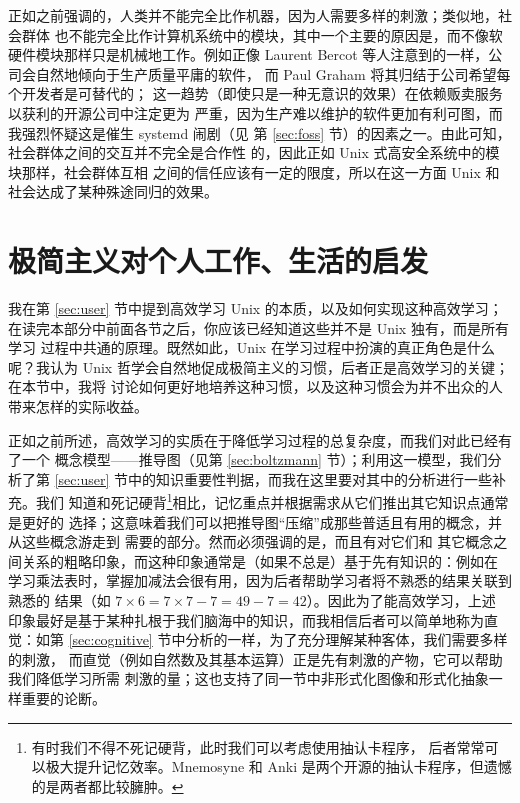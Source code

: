 正如之前强调的，人类并不能完全比作机器，因为人需要多样的刺激；类似地，社会群体
也不能完全比作计算机系统中的模块，其中一个主要的原因是，而不像软硬件模块那样只是机械地工作。例如正像 Laurent Bercot
等人注意到的一样，公司会自然地倾向于生产质量平庸的软件，
而 Paul Graham 将其归结于公司希望每个开发者是可替代的；
这一趋势（即使只是一种无意识的效果）在依赖贩卖服务以获利的开源公司中注定更为
严重，因为生产难以维护的软件更加有利可图，而我强烈怀疑这是催生 systemd 闹剧（见
第 \ref{sec:foss} 节）的因素之一。由此可知，社会群体之间的交互并不完全是合作性
的，因此正如 Unix 式高安全系统中的模块那样，社会群体互相
之间的信任应该有一定的限度，所以在这一方面 Unix 和社会达成了某种殊途同归的效果。

\section{极简主义对个人工作、生活的启发}\label{sec:worklife}

我在第 \ref{sec:user} 节中提到高效学习 Unix 的本质，以及如何实现这种高效学习；
在读完本部分中前面各节之后，你应该已经知道这些并不是 Unix 独有，而是所有学习
过程中共通的原理。既然如此，Unix 在学习过程中扮演的真正角色是什么呢？我认为
Unix 哲学会自然地促成极简主义的习惯，后者正是高效学习的关键；在本节中，我将
讨论如何更好地培养这种习惯，以及这种习惯会为并不出众的人带来怎样的实际收益。

正如之前所述，高效学习的实质在于降低学习过程的总复杂度，而我们对此已经有了一个
概念模型——推导图（见第 \ref{sec:boltzmann} 节）；利用这一模型，我们分析了第
\ref{sec:user} 节中的知识重要性判据，而我在这里要对其中的分析进行一些补充。我们
知道和死记硬背\footnote{有时我们不得不死记硬背，此时我们可以考虑使用抽认卡程序，
后者常常可以极大提升记忆效率。Mnemosyne 和 Anki 是两个开源的抽认卡程序，但遗憾
的是两者都比较臃肿。}相比，记忆重点并根据需求从它们推出其它知识点通常是更好的
选择；这意味着我们可以把推导图“压缩”成那些普适且有用的概念，并从这些概念游走到
需要的部分。然而必须强调的是，而且有对它们和
其它概念之间关系的粗略印象，而这种印象通常是（如果不总是）基于先有知识的：例如在
学习乘法表时，掌握加减法会很有用，因为后者帮助学习者将不熟悉的结果关联到熟悉的
结果（如 $7 \times 6 = 7 \times 7 - 7 = 49 - 7 = 42$）。因此为了能高效学习，上述
印象最好是基于某种扎根于我们脑海中的知识，而我相信后者可以简单地称为直觉：如第
\ref{sec:cognitive} 节中分析的一样，为了充分理解某种客体，我们需要多样的刺激，
而直觉（例如自然数及其基本运算）正是先有刺激的产物，它可以帮助我们降低学习所需
刺激的量；这也支持了同一节中非形式化图像和形式化抽象一样重要的论断。

